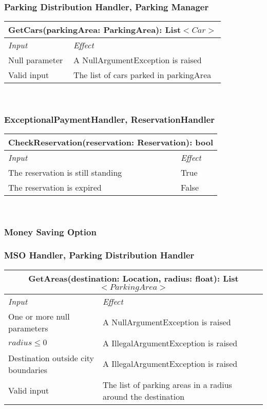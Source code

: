 		\subsubsection*{Parking Distribution Handler, Parking Manager}
			\begin{tabular}{ |l|l| }
				\hline
				\multicolumn{2}{|c|}{GetCars(parkingArea: ParkingArea): List$<Car>$}\\
				\hline
				\textit{Input} & \textit{Effect}\\ \hline
				Null parameter & A NullArgumentException is raised\\ \hline
				Valid input & The list of cars parked in parkingArea\\ \hline
			\end{tabular}
			\\
		
		
		
		\subsubsection*{ExceptionalPaymentHandler, ReservationHandler}
			\begin{tabular}{ |l|l| }
				\hline
				\multicolumn{2}{|c|}{CheckReservation(reservation: Reservation): bool}\\
				\hline
				\textit{Input} & \textit{Effect}\\ \hline
				The reservation is still standing & True\\ \hline
				The reservation is expired & False\\ \hline
			\end{tabular}
			\\
	
	
	
	\subsubsection{Money Saving Option}
		
		
			
		\subsubsection*{MSO Handler, Parking Distribution Handler}
			\begin{tabular}{ |l|l| }
				\hline
				\multicolumn{2}{|c|}{GetAreas(destination: Location, radius: float): List$<ParkingArea>$}\\
				\hline
				\textit{Input} & \textit{Effect}\\ \hline
				One or more null parameters & A NullArgumentException is raised\\ \hline
				$radius \leq 0$ & A IllegalArgumentException is raised\\ \hline
				Destination outside city boundaries & A IllegalArgumentException is raised\\ \hline
				Valid input & The list of parking areas in a radius around the destination\\ \hline
			\end{tabular}
			\\
		
